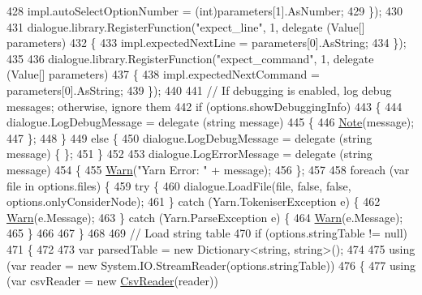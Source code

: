 \begin{DoxyCode}
428                 impl.autoSelectOptionNumber = (int)parameters[1].AsNumber;
429             \});
430 
431             dialogue.library.RegisterFunction(\textcolor{stringliteral}{"expect\_line"}, 1, delegate (Value[] parameters)
432             \{
433                 impl.expectedNextLine = parameters[0].AsString;
434             \});
435 
436             dialogue.library.RegisterFunction(\textcolor{stringliteral}{"expect\_command"}, 1, delegate (Value[] parameters)
437             \{
438                 impl.expectedNextCommand = parameters[0].AsString;
439             \});
440 
441             \textcolor{comment}{// If debugging is enabled, log debug messages; otherwise, ignore them}
442             \textcolor{keywordflow}{if} (options.showDebuggingInfo)
443             \{
444                 dialogue.LogDebugMessage = delegate (\textcolor{keywordtype}{string} message)
445                 \{
446                     \hyperlink{a00171_a939cc9e943c574b36c6af93e9c772702}{Note}(message);
447                 \};
448             \}
449             \textcolor{keywordflow}{else} \{
450                 dialogue.LogDebugMessage = delegate (\textcolor{keywordtype}{string} message) \{ \};
451             \}
452 
453             dialogue.LogErrorMessage = delegate (\textcolor{keywordtype}{string} message)
454             \{
455                 \hyperlink{a00171_a979bb6f049b6c5294f745a19e24ddd9d}{Warn}(\textcolor{stringliteral}{"Yarn Error: "} + message);
456             \};
457 
458             \textcolor{keywordflow}{foreach} (var file \textcolor{keywordflow}{in} options.files) \{
459                 \textcolor{keywordflow}{try} \{
460                     dialogue.LoadFile(file, \textcolor{keyword}{false}, \textcolor{keyword}{false}, options.onlyConsiderNode);
461                 \} \textcolor{keywordflow}{catch} (Yarn.TokeniserException e) \{
462                     \hyperlink{a00171_a979bb6f049b6c5294f745a19e24ddd9d}{Warn}(e.Message);
463                 \} \textcolor{keywordflow}{catch} (Yarn.ParseException e) \{
464                     \hyperlink{a00171_a979bb6f049b6c5294f745a19e24ddd9d}{Warn}(e.Message);
465                 \}
466 
467             \}
468 
469             \textcolor{comment}{// Load string table}
470             \textcolor{keywordflow}{if} (options.stringTable != null)
471             \{
472 
473                 var parsedTable = \textcolor{keyword}{new} Dictionary<string, string>();
474 
475                 \textcolor{keyword}{using} (var reader = \textcolor{keyword}{new} System.IO.StreamReader(options.stringTable))
476                 \{
477                     \textcolor{keyword}{using} (var csvReader = \textcolor{keyword}{new} \hyperlink{a00057}{CsvReader}(reader))

\end{DoxyCode}
